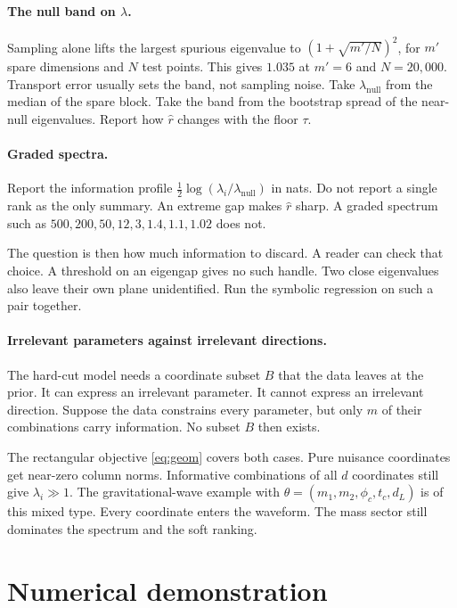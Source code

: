 \documentclass[11pt, letterpaper]{article}
\theoremstyle{definition}
\begin{document}
\paragraph{The null band on $\lambda$.}
Sampling alone lifts the largest spurious eigenvalue to
$(1+\sqrt{m'/N})^2$, for $m'$ spare dimensions and $N$ test points.
This gives $1.035$ at $m'=6$ and $N=20{,}000$.
Transport error usually sets the band, not sampling noise.
Take $\lambda_{\mathrm{null}}$ from the median of the spare block.
Take the band from the bootstrap spread of the near-null eigenvalues.
Report how $\hat r$ changes with the floor $\tau$.

\paragraph{Graded spectra.}
Report the information profile
$\tfrac12\log(\lambda_i/\lambda_{\mathrm{null}})$ in nats.
Do not report a single rank as the only summary.
An extreme gap makes $\hat r$ sharp.
A graded spectrum such as $500,200,50,12,3,1.4,1.1,1.02$ does not.

The question is then how much information to discard.
A reader can check that choice.
A threshold on an eigengap gives no such handle.
Two close eigenvalues also leave their own plane unidentified.
Run the symbolic regression on such a pair together.

\paragraph{Irrelevant parameters against irrelevant directions.}
The hard-cut model needs a coordinate subset $B$ that the data leaves at the
prior. It can express an irrelevant parameter.
It cannot express an irrelevant direction.
Suppose the data constrains every parameter, but only $m$ of their
combinations carry information. No subset $B$ then exists.

The rectangular objective \eqref{eq:geom} covers both cases.
Pure nuisance coordinates get near-zero column norms.
Informative combinations of all $d$ coordinates still give $\lambda_i\gg 1$.
The gravitational-wave example with
$\theta=(m_1,m_2,\phi_c,t_c,d_L)$ is of this mixed type.
Every coordinate enters the waveform.
The mass sector still dominates the spectrum and the soft ranking.

\section*{Numerical demonstration}
\end{document}
